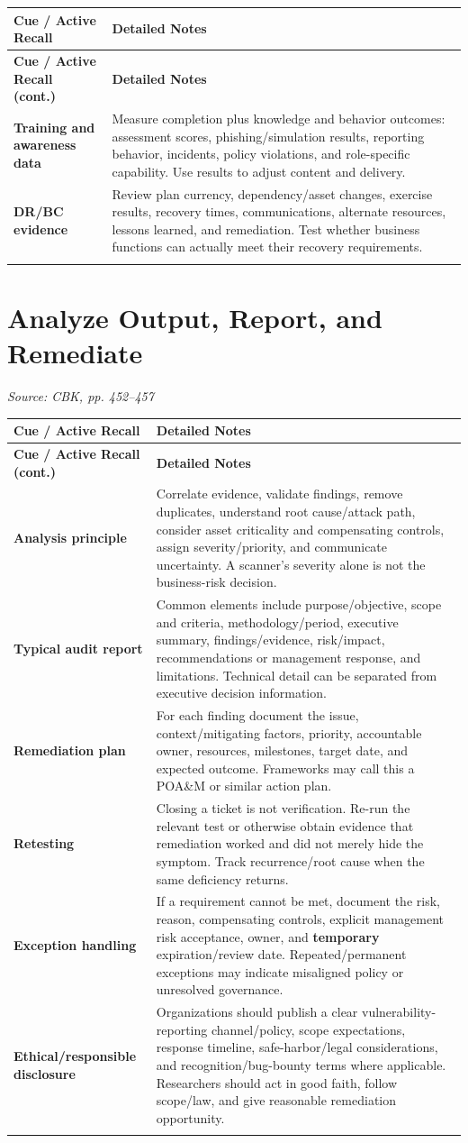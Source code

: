 \documentclass[10pt,letterpaper]{article}
\makeatletter
\newenvironment{cornell}{\rowcolors{2}{white}{notebg}\begin{longtable}{@{}>{\raggedright\arraybackslash\columncolor{cuebg}\color{navy}\bfseries}p{0.285\textwidth}>{\raggedright\arraybackslash}p{0.65\textwidth}@{}}\rowcolor{navy}\color{white}\textbf{Cue / Active Recall} & \color{white}\textbf{Detailed Notes}\\ \hline\endfirsthead\rowcolor{navy}\color{white}\textbf{Cue / Active Recall (cont.)} & \color{white}\textbf{Detailed Notes}\\ \hline\endhead}{\end{longtable}}
\newcommand{\noterow}[2]{#1 & #2\\\arrayrulecolor{line}\hline}\newcommand{\source}[1]{\par{\footnotesize\color{teal}\textit{Source: CBK, #1}}\par}
\makeatother
\begin{document}
\begin{cornell}
\noterow{Training and awareness data}{Measure completion plus knowledge and behavior outcomes: assessment scores, phishing/simulation results, reporting behavior, incidents, policy violations, and role-specific capability. Use results to adjust content and delivery.}
\noterow{DR/BC evidence}{Review plan currency, dependency/asset changes, exercise results, recovery times, communications, alternate resources, lessons learned, and remediation. Test whether business functions can actually meet their recovery requirements.}
\end{cornell}

\section{\color{navy}Analyze Output, Report, and Remediate}
\source{pp. 452--457}
\begin{cornell}
\noterow{Analysis principle}{Correlate evidence, validate findings, remove duplicates, understand root cause/attack path, consider asset criticality and compensating controls, assign severity/priority, and communicate uncertainty. A scanner's severity alone is not the business-risk decision.}
\noterow{Typical audit report}{Common elements include purpose/objective, scope and criteria, methodology/period, executive summary, findings/evidence, risk/impact, recommendations or management response, and limitations. Technical detail can be separated from executive decision information.}
\noterow{Remediation plan}{For each finding document the issue, context/mitigating factors, priority, accountable owner, resources, milestones, target date, and expected outcome. Frameworks may call this a POA\&M or similar action plan.}
\noterow{Retesting}{Closing a ticket is not verification. Re-run the relevant test or otherwise obtain evidence that remediation worked and did not merely hide the symptom. Track recurrence/root cause when the same deficiency returns.}
\noterow{Exception handling}{If a requirement cannot be met, document the risk, reason, compensating controls, explicit management risk acceptance, owner, and \textbf{temporary} expiration/review date. Repeated/permanent exceptions may indicate misaligned policy or unresolved governance.}
\noterow{Ethical/responsible disclosure}{Organizations should publish a clear vulnerability-reporting channel/policy, scope expectations, response timeline, safe-harbor/legal considerations, and recognition/bug-bounty terms where applicable. Researchers should act in good faith, follow scope/law, and give reasonable remediation opportunity.}
\end{cornell}
\end{document}
